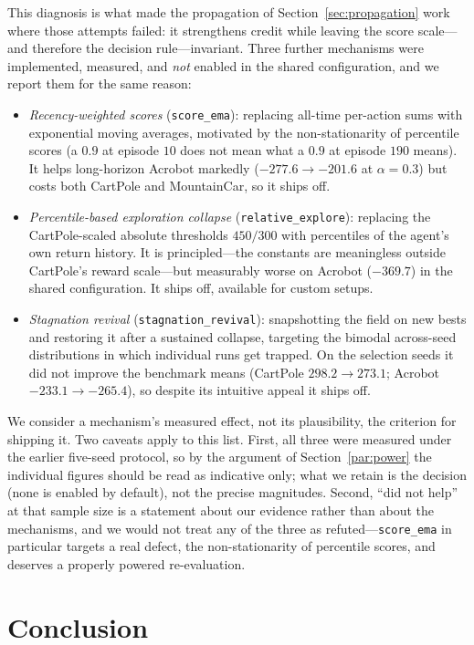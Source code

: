 \documentclass[11pt]{article}
\begin{document}
This diagnosis is what made the propagation of Section~\ref{sec:propagation}
work where those attempts failed: it strengthens credit while leaving the score
scale---and therefore the decision rule---invariant. Three further mechanisms
were implemented, measured, and \emph{not} enabled in the shared configuration,
and we report them for the same reason:
\begin{itemize}
  \item \emph{Recency-weighted scores} (\texttt{score\_ema}): replacing all-time
  per-action sums with exponential moving averages, motivated by the
  non-stationarity of percentile scores (a $0.9$ at episode $10$ does not mean
  what a $0.9$ at episode $190$ means). It helps long-horizon Acrobot markedly
  ($-277.6\to-201.6$ at $\alpha{=}0.3$) but costs both CartPole and
  MountainCar, so it ships off.
  \item \emph{Percentile-based exploration collapse}
  (\texttt{relative\_explore}): replacing the CartPole-scaled absolute
  thresholds $450/300$ with percentiles of the agent's own return history. It is
  principled---the constants are meaningless outside CartPole's reward
  scale---but measurably worse on Acrobot ($-369.7$) in the shared
  configuration. It ships off, available for custom setups.
  \item \emph{Stagnation revival} (\texttt{stagnation\_revival}): snapshotting
  the field on new bests and restoring it after a sustained collapse, targeting
  the bimodal across-seed distributions in which individual runs get trapped.
  On the selection seeds it did not improve the benchmark means (CartPole
  $298.2\to273.1$; Acrobot $-233.1\to-265.4$), so despite its intuitive appeal
  it ships off.
\end{itemize}
We consider a mechanism's measured effect, not its plausibility, the criterion
for shipping it. Two caveats apply to this list. First, all three were measured
under the earlier five-seed protocol, so by the argument of
Section~\ref{par:power} the individual figures should be read as indicative
only; what we retain is the decision (none is enabled by default), not the
precise magnitudes. Second, ``did not help'' at that sample size is a statement
about our evidence rather than about the mechanisms, and we would not treat any
of the three as refuted---\texttt{score\_ema} in particular targets a real
defect, the non-stationarity of percentile scores, and deserves a properly
powered re-evaluation.

\section{Conclusion}
\label{sec:conclusion}
\end{document}
